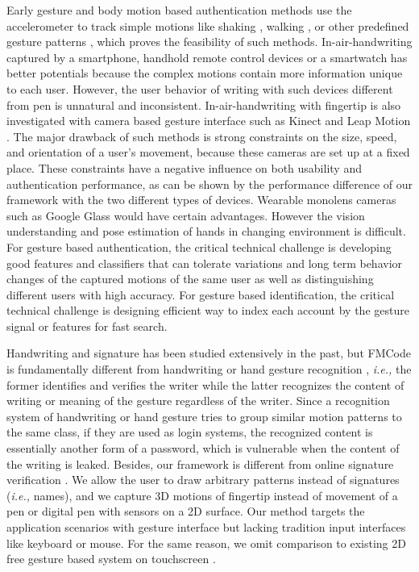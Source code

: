 \documentclass[conference]{IEEEtran}
\begin{document}
Early gesture and body motion based authentication methods use the accelerometer to track simple motions like shaking \cite{GIT, ArmSweep, ShakeWell}, walking \cite{ArmSwing, AreYouWithMe}, or other predefined gesture patterns \cite{Feasibility}, which proves the feasibility of such methods. In-air-handwriting captured by a smartphone\cite{Smartphone, Greece, Madrid-Analysis}, handhold remote control devices \cite{uWave} or a smartwatch \cite{HandWorn} has better potentials because the complex motions contain more information unique to each user. However, the user behavior of writing with such devices different from pen is unnatural and inconsistent. In-air-handwriting with fingertip is also investigated with camera based gesture interface such as Kinect \cite{KinWrite, Kinect-DTW, WaveToMe} and Leap Motion \cite{LeapPassword, CleanRoom, LeapHand, Poland}. The major drawback of such methods is strong constraints on the size, speed, and orientation of a user's movement, because these cameras are set up at a fixed place. These constraints have a negative influence on both usability and authentication performance, as can be shown by the performance difference of our framework with the two different types of devices. Wearable monolens cameras such as Google Glass \cite{VSig} would have certain advantages. However the vision understanding and pose estimation of hands in changing environment is difficult. For gesture based authentication, the critical technical challenge is developing good features and classifiers that can tolerate variations and long term behavior changes of the captured motions of the same user as well as distinguishing different users with high accuracy. For gesture based identification, the critical technical challenge is designing efficient way to index each account by the gesture signal or features for fast search.

Handwriting and signature has been studied extensively in the past, but FMCode is fundamentally different from handwriting \cite{Airwriting, OnlineWriting} or hand gesture recognition \cite{AirDraw, Serendipity, Tomo}, \textit{i.e.,} the former identifies and verifies the writer while the latter recognizes the content of writing or meaning of the gesture regardless of the writer. Since a recognition system of handwriting or hand gesture tries to group similar motion patterns to the same class, if they are used as login systems, the recognized content is essentially another form of a password, which is vulnerable when the content of the writing is leaked. Besides, our framework is different from online signature verification \cite{Signature}. We allow the user to draw arbitrary patterns instead of signatures (\textit{i.e.,} names), and we capture 3D motions of fingertip instead of movement of a pen or digital pen with sensors \cite{SmartPen-RDTW, DigiPen} on a 2D surface. Our method targets the application scenarios with gesture interface but lacking tradition input interfaces like keyboard or mouse. For the same reason, we omit comparison to existing 2D free gesture based system on touchscreen \cite{frank2013touchalytics, gong2016forgery, yang2016free}.
\end{document}
